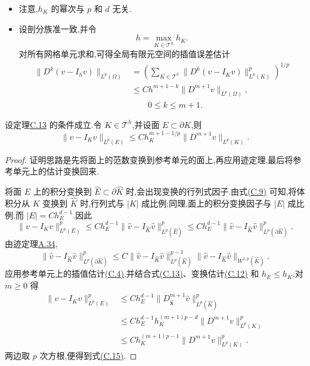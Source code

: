 \begin{note}[关于估计式(C.7)]\label{note:appendix-c-14}
\begin{itemize}
 \item 注意,$h_K$ 的幂次与 $p$ 和 $d$ 无关.
 \item 设剖分族准一致,并令
 \[
  h=\max_{K\in\mathcal T^h}h_K.
 \]
 对所有网格单元求和,可得全局有限元空间的插值误差估计
\begin{equation}\label{eq:interpolation-error-estimate}
\begin{aligned}
  \|D^k(v-I_hv)\|_{L^p(\Omega)}
  &=\left(\sum_{K\in\mathcal T^h}
   \|D^k(v-I_Kv)\|_{L^p(K)}^p\right)^{1/p}\\
  &\le Ch^{m+1-k}\|D^{m+1}v\|_{L^p(\Omega)},\\
  &\qquad 0\le k\le m+1.
\end{aligned}
\end{equation}
\end{itemize}
\end{note}

\begin{corollary}[面上的插值估计]\label{cor:appendix-c-15}
设定理\hyperref[thm:appendix-c-13]{C.13} 的条件成立.令 $K\in\mathcal T^h$,并设面 $E\subset\partial K$,则
\begin{equation}\label{eq:appendix-c-15}
 \|v-I_Kv\|_{L^p(E)}
 \le Ch_K^{m+1-1/p}\|D^{m+1}v\|_{L^p(K)}.
\end{equation}
\end{corollary}

\begin{proof}
证明思路是先将面上的范数变换到参考单元的面上,再应用迹定理,最后将参考单元上的估计变换回来.

将面 $E$ 上的积分变换到 $\widehat E\subset\partial\widehat K$ 时,会出现变换的行列式因子.由式\hyperref[eq:appendix-c-9]{(C.9)} 可知,将体积分从 $K$ 变换到 $\widehat K$ 时,行列式与 $|K|$ 成比例;同理,面上的积分变换因子与 $|E|$ 成比例,而 $|E|=Ch_E^{d-1}$.因此
\[
 \|v-I_Kv\|_{L^p(E)}^p
 \le Ch_E^{d-1}\|\widehat v-I_{\widehat K}\widehat v\|_{L^p(\widehat E)}^p
 \le Ch_E^{d-1}
       \|\widehat v-I_{\widehat K}\widehat v\|_{L^p(\partial\widehat K)}^p.
\]
由迹定理\hyperref[thm:appendix-a-34]{A.34},
\[
 \|\widehat v-I_{\widehat K}\widehat v\|_{L^p(\partial\widehat K)}^p
 \le C\|\widehat v-I_{\widehat K}\widehat v\|_{L^p(\widehat K)}^{p-1}
       \|\widehat v-I_{\widehat K}\widehat v\|_{W^{1,p}(\widehat K)}.
\]
应用参考单元上的插值估计\hyperref[eq:appendix-c-4]{(C.4)},并结合式\hyperref[eq:appendix-c-13]{(C.13)}、变换估计\hyperref[eq:appendix-c-12]{(C.12)} 和 $h_E\le h_K$,对 $m\ge0$ 得
\[
\begin{aligned}
 \|v-I_Kv\|_{L^p(E)}^p
 &\le Ch_E^{d-1}
   \|D^{m+1}_{\widehat{\bm x}}\widehat v\|_{L^p(\widehat K)}^p\\
 &\le Ch_E^{d-1}h_K^{(m+1)p-d}
   \|D^{m+1}v\|_{L^p(K)}^p\\
 &\le Ch_K^{(m+1)p-1}\|D^{m+1}v\|_{L^p(K)}^p.
\end{aligned}
\]
两边取 $p$ 次方根,便得到式\hyperref[eq:appendix-c-15]{(C.15)}.
\end{proof}

